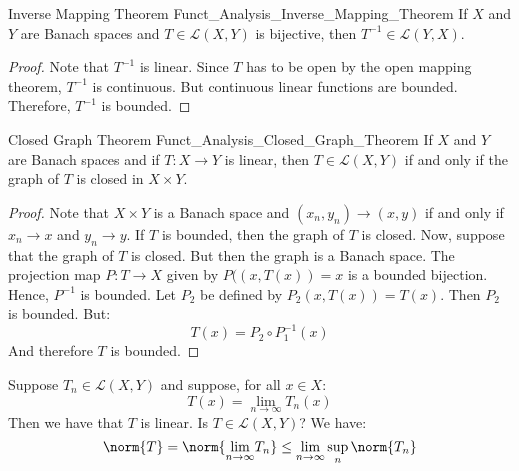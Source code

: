 \documentclass[crop=false,class=book,oneside]{standalone}                      %
\begin{document}
        \begin{ltheorem}{Inverse Mapping Theorem}
              {Funct_Analysis_Inverse_Mapping_Theorem}
            If $X$ and $Y$ are Banach spaces and
            $T\in\mathcal{L}(X,Y)$ is bijective, then
            $T^{\minus{1}}\in\mathcal{L}(Y,X)$.
        \end{ltheorem}
        \begin{proof}
            Note that $T^{\minus{1}}$ is linear. Since $T$ has to be
            open by the open mapping theorem, $T^{\minus{1}}$ is
            continuous. But continuous linear functions are bounded.
            Therefore, $T^{\minus{1}}$ is bounded.
        \end{proof}
        \begin{ltheorem}{Closed Graph Theorem}
              {Funct_Analysis_Closed_Graph_Theorem}
            If $X$ and $Y$ are Banach spaces and if
            $T:X\rightarrow{Y}$ is linear, then
            $T\in\mathcal{L}(X,Y)$ if and only if the graph of
            $T$ is closed in $X\times{Y}$.
        \end{ltheorem}
        \begin{proof}
            Note that $X\times{Y}$ is a Banach space and
            $(x_{n},y_{n})\rightarrow(x,y)$ if and only if
            $x_{n}\rightarrow{x}$ and $y_{n}\rightarrow{y}$.
            If $T$ is bounded, then the graph of $T$ is closed.
            Now, suppose that the graph of $T$ is closed. But
            then the graph is a Banach space. The projection map
            $P:T\rightarrow{X}$ given by $P((x,T(x))=x$ is
            a bounded bijection. Hence, $P^{\minus{1}}$ is bounded.
            Let $P_{2}$ be defined by $P_{2}(x,T(x))=T(x)$. Then
            $P_{2}$ is bounded. But:
            \begin{equation}
                T(x)=P_{2}\circ{P}_{1}^{\minus{1}}(x)
            \end{equation}
            And therefore $T$ is bounded.
        \end{proof}
        \begin{lexample}
            Suppose $T_{n}\in\mathcal{L}(X,Y)$ and suppose, for
            all $x\in{X}$:
            \begin{equation}
                T(x)=\underset{n\rightarrow\infty}{\lim}T_{n}(x)
            \end{equation}
            Then we have that $T$ is linear. Is
            $T\in\mathcal{L}(X,Y)$? We have:
            \begin{equation}
                \norm{T}=
                \norm{\underset{n\rightarrow\infty}{\lim}T_{n}}
                \leq\underset{n\rightarrow\infty}{\lim}\sup_{n}
                \norm{T_{n}}
            \end{equation}
        \end{lexample}
\end{document}

